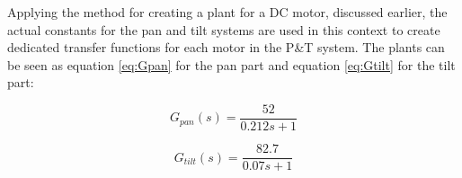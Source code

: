 Applying the method for creating a plant for a DC motor, discussed earlier, the actual constants for the pan and tilt systems are used in this context to create dedicated transfer functions for each motor in the P\&T system. The plants can be seen as equation \ref{eq:Gpan} for the pan part and equation \ref{eq:Gtilt} for the tilt part:

\begin{equation}
G_{pan} (s) = \frac{52}{0.212s+1}
\label{eq:Gpan}
\end{equation}

\begin{equation}
G_{tilt} (s) = \frac{82.7}{0.07s+1}
\label{eq:Gtilt}
\end{equation}